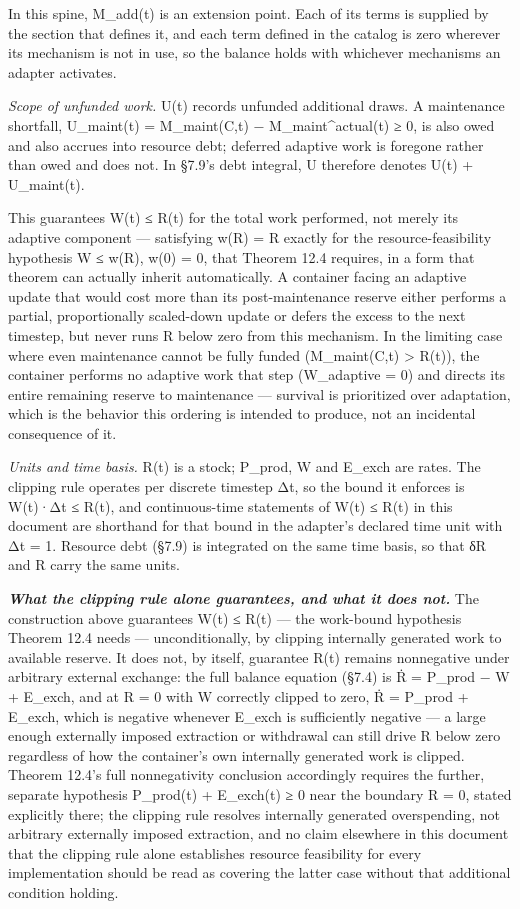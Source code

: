 \documentclass[
]{article}
\begin{document}
In this spine, M\_add(t) is an extension point. Each of its terms is
supplied by the section that defines it, and each term defined in the
catalog is zero wherever its mechanism is not in use, so the balance
holds with whichever mechanisms an adapter activates.

\emph{Scope of unfunded work.} U(t) records unfunded additional draws. A
maintenance shortfall, U\_maint(t) = M\_maint(C,t) −
M\_maint\^{}actual(t) ≥ 0, is also owed and also accrues into resource
debt; deferred adaptive work is foregone rather than owed and does not.
In §7.9's debt integral, U therefore denotes U(t) + U\_maint(t).

This guarantees W(t) ≤ R(t) for the total work performed, not merely its
adaptive component --- satisfying w(R) = R exactly for the
resource-feasibility hypothesis W ≤ w(R), w(0) = 0, that Theorem 12.4
requires, in a form that theorem can actually inherit automatically. A
container facing an adaptive update that would cost more than its
post-maintenance reserve either performs a partial, proportionally
scaled-down update or defers the excess to the next timestep, but never
runs R below zero from this mechanism. In the limiting case where even
maintenance cannot be fully funded (M\_maint(C,t) \textgreater{} R(t)),
the container performs no adaptive work that step (W\_adaptive = 0) and
directs its entire remaining reserve to maintenance --- survival is
prioritized over adaptation, which is the behavior this ordering is
intended to produce, not an incidental consequence of it.

\emph{Units and time basis.} R(t) is a stock; P\_prod, W and E\_exch are
rates. The clipping rule operates per discrete timestep Δt, so the bound
it enforces is W(t)·Δt ≤ R(t), and continuous-time statements of W(t) ≤
R(t) in this document are shorthand for that bound in the adapter's
declared time unit with Δt = 1. Resource debt (§7.9) is integrated on
the same time basis, so that δR and R carry the same units.

\emph{\textbf{What the clipping rule alone guarantees, and what it does
not.}} The construction above guarantees W(t) ≤ R(t) --- the work-bound
hypothesis Theorem 12.4 needs --- unconditionally, by clipping
internally generated work to available reserve. It does not, by itself,
guarantee R(t) remains nonnegative under arbitrary external exchange:
the full balance equation (§7.4) is Ṙ = P\_prod − W + E\_exch, and at R
= 0 with W correctly clipped to zero, Ṙ = P\_prod + E\_exch, which is
negative whenever E\_exch is sufficiently negative --- a large enough
externally imposed extraction or withdrawal can still drive R below zero
regardless of how the container's own internally generated work is
clipped. Theorem 12.4's full nonnegativity conclusion accordingly
requires the further, separate hypothesis P\_prod(t) + E\_exch(t) ≥ 0
near the boundary R = 0, stated explicitly there; the clipping rule
resolves internally generated overspending, not arbitrary externally
imposed extraction, and no claim elsewhere in this document that the
clipping rule alone establishes resource feasibility for every
implementation should be read as covering the latter case without that
additional condition holding.
\end{document}
